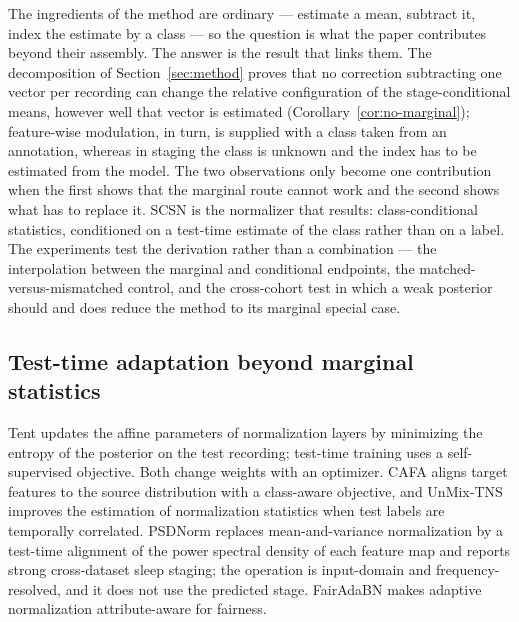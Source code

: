 The ingredients of the method are ordinary --- estimate a mean, subtract it,
index the estimate by a class --- so the question is what the paper contributes
beyond their assembly. The answer is the result that links them. The
decomposition of Section~\ref{sec:method} proves that no correction subtracting
one vector per recording can change the relative configuration of the
stage-conditional means, however well that vector is estimated
(Corollary~\ref{cor:no-marginal}); feature-wise modulation, in turn, is
supplied with a class taken from an annotation, whereas in staging the class is
unknown and the index has to be estimated from the model.
The two observations only become one contribution when the first shows that the
marginal route cannot work and the second shows what has to replace it. SCSN is
the normalizer that results: class-conditional statistics, conditioned on a
test-time estimate of the class rather than on a label. The experiments test
the derivation rather than a combination --- the interpolation between the
marginal and conditional endpoints, the matched-versus-mismatched control, and
the cross-cohort test in which a weak posterior should and does reduce the
method to its marginal special case.

\subsection{Test-time adaptation beyond marginal statistics}

Tent \citep{wang2021tent} updates the affine parameters of normalization
layers by minimizing the entropy of the posterior on the test recording;
test-time training \citep{sun2020ttt} uses a self-supervised objective. Both
change weights with an optimizer. CAFA \citep{cafa2023} aligns target features
to the source distribution with a class-aware objective, and UnMix-TNS
\citep{unmixtns2024} improves the estimation of normalization statistics when
test labels are temporally correlated. PSDNorm \citep{psdnorm2026} replaces
mean-and-variance normalization by a test-time alignment of the power spectral
density of each feature map and reports strong cross-dataset sleep staging;
the operation is input-domain and frequency-resolved, and it does not use the
predicted stage. FairAdaBN \citep{fairadabn2023} makes adaptive normalization
attribute-aware for fairness.

